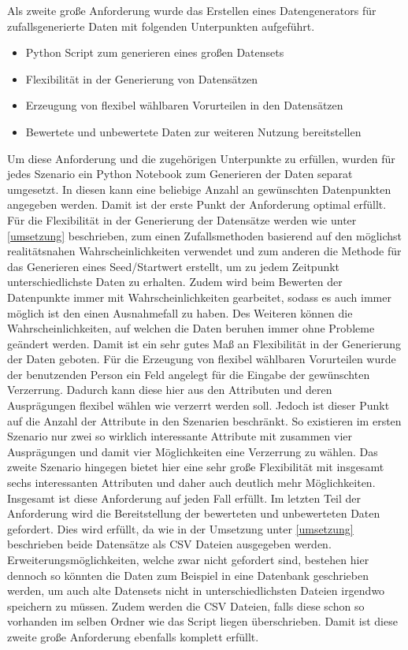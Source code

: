 \begin{onehalfspace}
Als zweite große Anforderung wurde das Erstellen eines Datengenerators für zufallsgenerierte Daten mit folgenden Unterpunkten aufgeführt.
\begin{itemize}
    \item Python Script zum generieren eines großen Datensets
    \item Flexibilität in der Generierung von Datensätzen
    \item Erzeugung von flexibel wählbaren Vorurteilen in den Datensätzen
    \item Bewertete und unbewertete Daten zur weiteren Nutzung bereitstellen
\end{itemize}
Um diese Anforderung und die zugehörigen Unterpunkte zu erfüllen, wurden für jedes Szenario ein Python Notebook zum Generieren der Daten separat umgesetzt. In diesen kann eine beliebige Anzahl an gewünschten Datenpunkten angegeben werden. Damit ist der erste Punkt der Anforderung optimal erfüllt. Für die Flexibilität in der Generierung der Datensätze werden wie unter \ref{umsetzung} beschrieben, zum einen Zufallsmethoden basierend auf den möglichst realitätsnahen Wahrscheinlichkeiten verwendet und zum anderen die Methode für das Generieren eines Seed/Startwert erstellt, um zu jedem Zeitpunkt unterschiedlichste Daten zu erhalten. Zudem wird beim Bewerten der Datenpunkte immer mit Wahrscheinlichkeiten gearbeitet, sodass es auch immer möglich ist den einen Ausnahmefall zu haben. Des Weiteren können die Wahrscheinlichkeiten, auf welchen die Daten beruhen immer ohne Probleme geändert werden. Damit ist ein sehr gutes Maß an Flexibilität in der Generierung der Daten geboten.
Für die Erzeugung von flexibel wählbaren Vorurteilen wurde der benutzenden Person ein Feld angelegt für die Eingabe der gewünschten Verzerrung. Dadurch kann diese hier aus den Attributen und deren Ausprägungen flexibel wählen wie verzerrt werden soll. Jedoch ist dieser Punkt auf die Anzahl der Attribute in den Szenarien beschränkt. So existieren im ersten Szenario nur zwei so wirklich interessante Attribute mit zusammen vier Ausprägungen und damit vier Möglichkeiten eine Verzerrung zu wählen. Das zweite Szenario hingegen bietet hier eine sehr große Flexibilität mit insgesamt sechs interessanten Attributen und daher auch deutlich mehr Möglichkeiten. Insgesamt ist diese Anforderung auf jeden Fall erfüllt. 
Im letzten Teil der Anforderung wird die Bereitstellung der bewerteten und unbewerteten Daten gefordert. Dies wird erfüllt, da wie in der Umsetzung unter \ref{umsetzung} beschrieben beide Datensätze als CSV Dateien ausgegeben werden. Erweiterungsmöglichkeiten, welche zwar nicht gefordert sind, bestehen hier dennoch so könnten die Daten zum Beispiel in eine Datenbank geschrieben werden, um auch alte Datensets nicht in unterschiedlichsten Dateien irgendwo speichern zu müssen. Zudem werden die CSV Dateien, falls diese schon so vorhanden im selben Ordner wie das Script liegen überschrieben. Damit ist diese zweite große Anforderung ebenfalls komplett erfüllt.\\

\end{onehalfspace}
